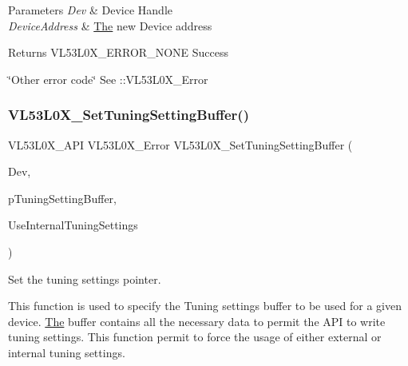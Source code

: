 \begin{DoxyParams}{Parameters}
{\em Dev} & Device Handle \\
\hline
{\em Device\+Address} & \hyperlink{structThe}{The} new Device address \\
\hline
\end{DoxyParams}
\begin{DoxyReturn}{Returns}
V\+L53\+L0\+X\+\_\+\+E\+R\+R\+O\+R\+\_\+\+N\+O\+NE Success 

\char`\"{}\+Other error code\char`\"{} See \+::\+V\+L53\+L0\+X\+\_\+\+Error 
\end{DoxyReturn}
\mbox{\label{group__VL53L0X__init__group_gabf9df2a66482932ebedab524ecedaaf1}} 
\subsubsection{\texorpdfstring{V\+L53\+L0\+X\+\_\+\+Set\+Tuning\+Setting\+Buffer()}{VL53L0X\_SetTuningSettingBuffer()}}
{\footnotesize\ttfamily V\+L53\+L0\+X\+\_\+\+A\+PI V\+L53\+L0\+X\+\_\+\+Error V\+L53\+L0\+X\+\_\+\+Set\+Tuning\+Setting\+Buffer (\begin{DoxyParamCaption}\item[{\hyperlink{group__VL53L0X__platform__group_ga2d6405308b1dd524b462f1b8fb97d167}{V\+L53\+L0\+X\+\_\+\+D\+EV}}]{Dev,  }\item[{\hyperlink{vl53l0x__types_8h_aba7bc1797add20fe3efdf37ced1182c5}{uint8\+\_\+t} $\ast$}]{p\+Tuning\+Setting\+Buffer,  }\item[{\hyperlink{vl53l0x__types_8h_aba7bc1797add20fe3efdf37ced1182c5}{uint8\+\_\+t}}]{Use\+Internal\+Tuning\+Settings }\end{DoxyParamCaption})}



Set the tuning settings pointer. 

This function is used to specify the Tuning settings buffer to be used for a given device. \hyperlink{structThe}{The} buffer contains all the necessary data to permit the A\+PI to write tuning settings. This function permit to force the usage of either external or internal tuning settings.

